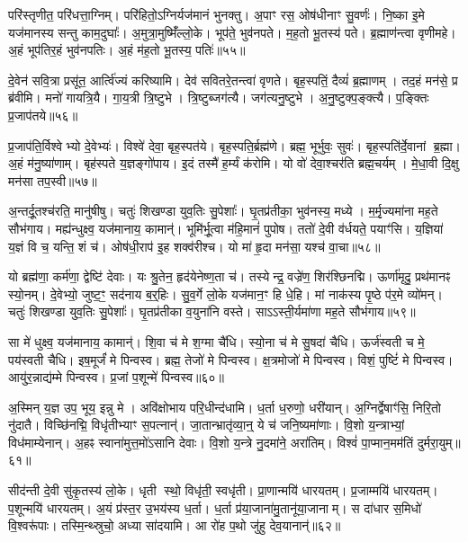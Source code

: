 परि॑स्तृणीत॒ परि॑धत्ता॒ग्निम्।
परि॑हितो॒\-ऽग्निर्यज॑मानं भुनक्तु।
अ॒पाꣳ रस॒ ओष॑धीनाꣳ सु॒वर्णः॑।
नि॒ष्का इ॒मे यज॑मानस्य सन्तु काम॒दुघाः᳚।
अ॒मुत्रा॒मुष्मिँ॑ल्लो॒के।
भूप॑ते॒ भुव॑नपते।
म॒ह॒तो भू॒तस्य॑ पते।
ब्र॒ह्माण॑न्त्वा वृणीमहे।
अ॒हं भूप॑तिर॒हं भुव॑नपतिः।
अ॒हं म॑ह॒तो भू॒तस्य॒ पतिः॑॥५५॥

दे॒वेन॑ सवि॒त्रा प्रसू॑त॒ आर्त्वि॑ज्यं करिष्यामि।
देव॑ सवितरे॒तन्त्वा॑ वृणते।
बृह॒स्पतिं॒ दैव्यं॑ ब्र॒ह्माणम्।
तद॒हं मन॑से॒ प्र ब्र॑वीमि।
मनो॑ गायत्रि॒यै।
गा॒य॒त्री त्रि॒ष्टुभे।
त्रि॒ष्टुब्जग॑त्यै।
जग॑त्यनु॒ष्टुभे।
अ॒नु॒ष्टुक्प॒ङ्क्त्यै।
प॒ङ्क्तिः प्र॒जाप॑तये॥५६॥

प्र॒जाप॑ति॒र्विश्वेभ्यो दे॒वेभ्यः॑।
विश्वे॑ देवा॒ बृह॒स्पत॑ये।
बृह॒स्पति॒र्ब्रह्म॑णे।
ब्रह्म॒ भूर्भुवः॒ सुवः॑।
बृह॒स्पति॑र्दे॒वानां ब्र॒ह्मा।
अ॒हं म॑नु॒ष्या॑णाम्।
बृह॑स्पते य॒ज्ञङ्गो॑पाय।
इ॒दं तस्मै॑ ह॒र्म्यं क॑रोमि।
यो वो॑ देवा॒श्चर॑ति ब्रह्म॒चर्यम्।
मे॒धा॒वी दि॒क्षु मन॑सा तप॒स्वी॥५७॥

अ॒न्तर्दू॒तश्च॑रति॒ मानु॑षीषु।
चतुः॑ शिखण्डा युव॒तिः सु॒पेशाः᳚।
घृ॒तप्र॑तीका॒ भुव॑नस्य॒ मध्ये।
म॒र्मृ॒ज्यमा॑ना मह॒ते सौभ॑गाय।
मह्य॑न्धुक्ष्व॒ यज॑मानाय॒ कामान्॑।
भूमि॑र्भू॒त्वा म॑हि॒मानं॑ पुपोष।
ततो॑ दे॒वी व॑र्धयते॒ पयाꣳ॑सि।
य॒ज्ञिया॑ य॒ज्ञं वि च॒ यन्ति॒ शं च॑।
ओष॑धी॒राप॑ इ॒ह शक्व॑रीश्च।
यो मा॑ हृ॒दा मन॑सा॒ यश्च॑ वा॒चा॥५८॥

यो ब्रह्म॑णा॒ कर्म॑णा॒ द्वेष्टि॑ देवाः।
यः श्रु॒तेन॒ हृद॑येनेष्ण॒ता च॑।
तस्येन्द्र॒ वज्रे॑ण॒ शिर॑श्छिनद्मि।
ऊर्णा॑मृदु॒ प्रथ॑मानꣴ स्यो॒नम्।
दे॒वेभ्यो॒ जुष्ट॒ꣳ॒ सद॑नाय ब॒र्॒हिः।
सु॒व॒र्गे लो॒के यज॑मान॒ꣳ हि धे॒हि।
मां नाक॑स्य पृ॒ष्ठे प॑र॒मे व्यो॑मन्।
चतुः॑ शिखण्डा युव॒तिः सु॒पेशाः᳚।
घृ॒तप्र॑तीका व॒युना॑नि वस्ते।
साऽऽस्ती॒र्यमा॑णा मह॒ते सौभ॑गाय॥५९॥

सा मे॑ धुक्ष्व॒ यज॑मानाय॒ कामान्॑।
शि॒वा च॑ मे श॒ग्मा चै॑धि।
स्यो॒ना च॑ मे सु॒षदा॑ चैधि।
ऊर्ज॑स्वती च मे॒ पय॑स्वती चैधि।
इष॒मूर्जं॑ मे पिन्वस्व।
ब्रह्म॒ तेजो॑ मे पिन्वस्व।
क्ष॒त्रमोजो॑ मे पिन्वस्व।
विशं॒ पुष्टिं॑ मे पिन्वस्व।
आयु॑र॒न्नाद्य॑म्मे पिन्वस्व।
प्र॒जां प॒शून्मे॑ पिन्वस्व॥६०॥

अ॒स्मिन् य॒ज्ञ उप॒ भूय॒ इन्नु मे।
अवि॑क्षोभाय परि॒धीन्द॑धामि।
ध॒र्ता ध॒रुणो॒ धरी॑यान्।
अ॒ग्निर्द्वेषाꣳ॑सि॒ निरि॒तो नु॑दातै।
विच्छि॑नद्मि॒ विधृ॑तीभ्याꣳ स॒पत्नान्॑।
जा॒तान्भ्रातृ॑व्या॒न्॒ ये च॑ जनि॒ष्यमा॑णाः।
वि॒शो य॒न्त्राभ्यां॒ विध॑माम्येनान्।
अ॒हꣴ स्वाना॑मुत्त॒मो॑\-ऽसानि देवाः।
वि॒शो य॒न्त्रे नु॒दमा॑ने॒ अरा॑तिम्।
विश्वं॑ पा॒प्मान॒मम॑तिं दुर्मरा॒युम्॥६१॥

सीद॑न्ती दे॒वी सु॑कृ॒तस्य॑ लो॒के।
धृती स्थो॒ विधृ॑ती॒ स्वधृ॑ती।
प्रा॒णान्मयि॑ धारयतम्।
प्र॒जाम्मयि॑ धारयतम्।
प॒शून्मयि॑ धारयतम्।
अ॒यं प्र॑स्त॒र उ॒भय॑स्य ध॒र्ता।
ध॒र्ता प्र॑या॒जाना॑मु॒तानू॑या॒जानाम्।
स दा॑धार स॒मिधो॑ वि॒श्वरू॑पाः।
तस्मि॒न्थ्स्रुचो॒ अध्या सा॑दयामि।
आ रो॑ह प॒थो जु॑हु देव॒यानान्॑॥६२॥

